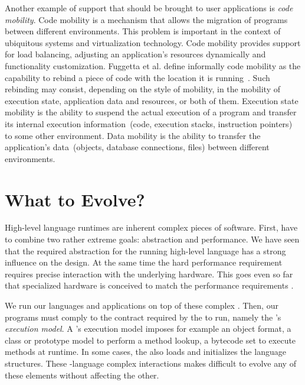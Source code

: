 Another example of support that should be brought to user applications is \emph{code mobility}. Code mobility is a mechanism that allows the migration of programs between different environments. This problem is important in the context of ubiquitous systems and virtualization technology. Code mobility provides support for \eg load balancing, adjusting an application's resources dynamically and functionality customization. Fuggetta et al. define informally code mobility as the capability to rebind a piece of code with the location it is running~\cite{Fugg98a}. Such rebinding may consist, depending on the style of mobility, in the mobility of execution state, application data and resources, or both of them. Execution state mobility is the ability to suspend the actual execution of a program and transfer its internal execution information~(\eg code, execution stacks, instruction pointers) to some other environment. Data mobility is the ability to transfer the application's data~(\eg objects, database connections, files) between different environments.


\section{What to Evolve?}

High-level language runtimes are inherent complex pieces of software.
First, \VMs have to combine two rather extreme goals: abstraction and performance.
We have seen that the required abstraction for the running high-level language has a strong influence on the \VM design.
At the same time the hard performance requirement requires precise interaction with the underlying hardware.
This goes even so far that specialized hardware is conceived to match the performance requirements \cite{Unga84a,Stef84a,McGh98a,Clic05a}.


We run our languages and applications on top of these complex \VMs.
Then, our programs must comply to the contract required by the \VM to run, namely the \VM's \emph{execution model}.
A \VM's execution model imposes for example an object format, a class or prototype model to perform a method lookup, a bytecode set to execute methods at runtime.
In some cases, the \VM also loads and initializes the language structures.
These \VM-language complex interactions makes difficult to evolve any of these elements without affecting the other.

